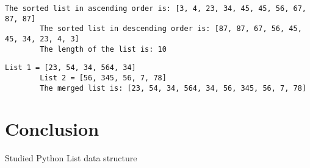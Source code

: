 \documentclass{article}
\begin{document}
	\begin{lstlisting}[caption={Exercise 3 Output}]
		The sorted list in ascending order is: [3, 4, 23, 34, 45, 45, 56, 67, 87, 87]
		The sorted list in descending order is: [87, 87, 67, 56, 45, 45, 34, 23, 4, 3]
		The length of the list is: 10
	\end{lstlisting}

	\begin{lstlisting}[caption={Exercise 4 Output}]
		List 1 = [23, 54, 34, 564, 34]
		List 2 = [56, 345, 56, 7, 78]
		The merged list is: [23, 54, 34, 564, 34, 56, 345, 56, 7, 78]
	\end{lstlisting}
	\section{\textbf{Conclusion}}
	Studied Python List data structure
\end{document}
